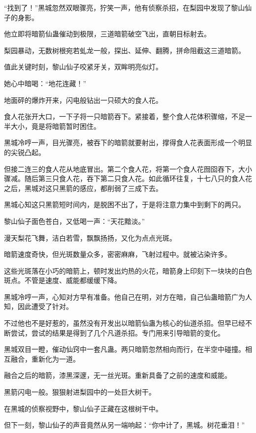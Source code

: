 
\begin{this_body}

“找到了！”黑城忽然双眼骤亮，狞笑一声，他有侦察杀招，在梨园中发现了黎山仙子的身影。

他立即将暗箭仙蛊催动到极限，三道暗箭破空飞出，直朝目标射去。

梨园暴动，无数树根宛若虬龙一般，探出、延伸、翻腾，拼命阻截这三道暗箭。

值此关键时刻，黎山仙子咬紧牙关，双眸明亮似灯。

她心中暗喝：“地花连藏！”

地面砰的爆炸开来，闪电般钻出一只硕大的食人花。

食人花张开大口，一下子将一只暗箭吞下。紧接着，整个食人花体积骤缩，不足一半大小，竟是将暗箭暂时困住。

黑城冷哼一声，目光骤亮，被吞下的暗箭就要射出，撑得食人花表面形成一个明显的尖锐凸起。

但接二连三的食人花从地底冒出。第二个食人花，将第一个食人花囫囵吞下，大小骤减。随后第三只食人花，吞下第二只食人花。如此循环往复，十七八只的食人花之后，黑城对这只黑箭的感应，都削弱了三成下去。

黑城心知这只黑箭短时间内，是脱困不出了，于是将注意力集中到剩下的两只。

黎山仙子面色苍白，又低喝一声：“天花黯淡。”

漫天梨花飞舞，洁白若雪，飘飘扬扬，又化为点点光斑。

暗箭速度奇快，但光斑数量众多，密密麻麻，飞射过程中。就被沾染许多。

这些光斑落在小巧的暗箭上，顿时发出灼热的火花，暗箭身上印刻下一块块的白色斑点。不管是速度、威能都缓缓下降。

黑城冷哼一声，心知对方早有准备。他自己在明，对方在暗，自己仙蛊暗箭广为人知，因此遭受了针对。

不过他也不是好惹的，虽然没有开发出以暗箭仙蛊为核心的仙道杀招。但早已经不断尝试，尝试的结果是得到了几个凡道杀招。专门用来引导暗箭的变化。

黑城双目一瞪，催动仙窍中一套凡蛊。两只暗箭忽然相向而行，在半空中碰撞。相互融合，重新化为一道。

融合之后的暗箭，漆黑深邃，无一丝光斑。重新具备了之前的速度和威能。

黑箭闪电一般。狠狠射进梨园中的一处巨大树干。

在黑城的侦察视野中，黎山仙子正藏在这根树干中。

但下一刻，黎山仙子的声音竟然从另一端响起：“你中计了，黑城。树花垂泪！”


\end{this_body}
